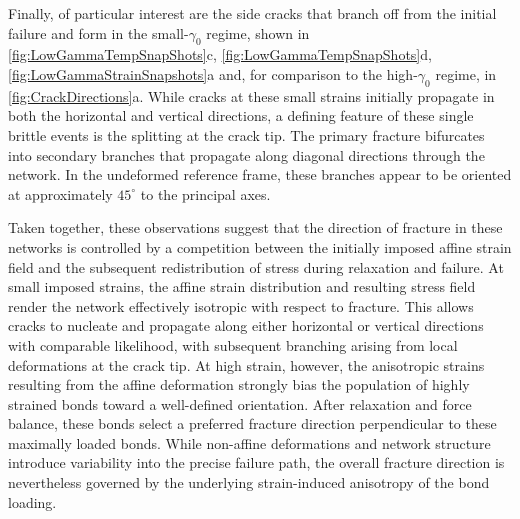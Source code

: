 \documentclass[asymmetricmargins]{library/duthesis}%
\begin{document}
Finally, of particular interest are the side cracks that branch off from the initial failure and form in the small-$\gamma_0$ regime, shown in \cref{fig:LowGammaTempSnapShots}c, \cref{fig:LowGammaTempSnapShots}d, \cref{fig:LowGammaStrainSnapshots}a and, for comparison to the high-$\gamma_0$ regime, in \cref{fig:CrackDirections}a. While cracks at these small strains initially propagate in both the horizontal and vertical directions, a defining feature of these single brittle events is the splitting at the crack tip. The primary fracture bifurcates into secondary branches that propagate along diagonal directions through the network. In the undeformed reference frame, these branches appear to be oriented at approximately $45^\circ$ to the principal axes.


Taken together, these observations suggest that the direction of fracture in these networks is controlled by a competition between the initially imposed affine strain field and the subsequent redistribution of stress during relaxation and failure. At small imposed strains, the affine strain distribution and resulting stress field render the network effectively isotropic with respect to fracture. This allows cracks to nucleate and propagate along either horizontal or vertical directions with comparable likelihood, with subsequent branching arising from local deformations at the crack tip. At high strain, however, the anisotropic strains resulting from the affine deformation strongly bias the population of highly strained bonds toward a well-defined orientation. After relaxation and force balance, these bonds select a preferred fracture direction perpendicular to these maximally loaded bonds. While non-affine deformations and network structure introduce variability into the precise failure path, the overall fracture direction is nevertheless governed by the underlying strain-induced anisotropy of the bond loading.
\end{document}
